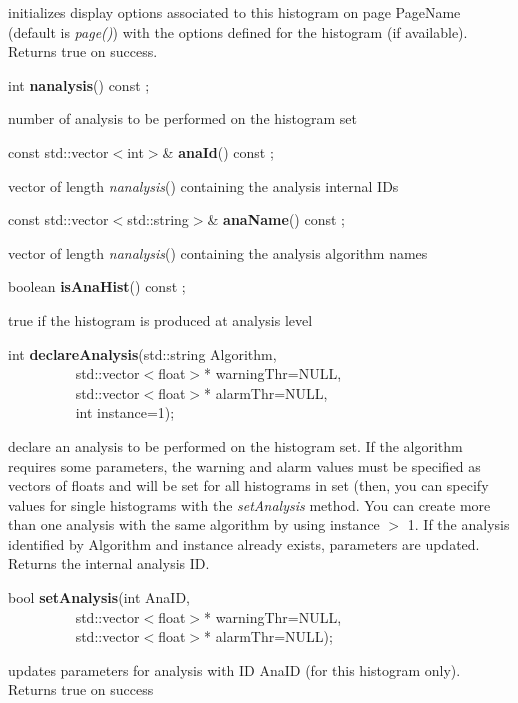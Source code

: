  initializes display options associated to this histogram on page
 PageName (default is {\it page()}) with the
 options defined for the histogram (if available). Returns true on
 success.


\item    int {\bf nanalysis}() const ;

 number of analysis to be performed on the histogram set


\item    const std::vector$<$int$>$\& {\bf anaId}() const ;

 vector of length {\it  nanalysis}() containing the analysis internal IDs


\item    const std::vector$<$std::string$>$\& {\bf anaName}() const ;

 vector of length {\it  nanalysis}() containing the analysis algorithm names


\item    boolean {\bf isAnaHist}() const ;

 true if the histogram is produced at analysis level


\item    int {\bf declareAnalysis}(std::string Algorithm,\\\mbox{}~~~~~~~~~ 
		      std::vector$<$float$>$* warningThr=NULL,\\\mbox{}~~~~~~~~~ 
		      std::vector$<$float$>$* alarmThr=NULL,\\\mbox{}~~~~~~~~~ 
		      int instance=1);

 declare an analysis to be performed on the histogram set. If the algorithm
 requires some parameters, the warning and alarm values must be
 specified as vectors of floats and will be set for all histograms in
 set (then, you can specify values for single histograms with the {\it
 setAnalysis} method. 
 You can create more than one analysis
 with the same algorithm by using instance $>$ 1. If the analysis
 identified by Algorithm and instance already exists, parameters are
 updated. Returns the internal analysis ID.


\item    bool {\bf setAnalysis}(int AnaID,\\\mbox{}~~~~~~~~~ 
		   std::vector$<$float$>$* warningThr=NULL,\\\mbox{}~~~~~~~~~ 
		   std::vector$<$float$>$* alarmThr=NULL);

 updates parameters for analysis with ID AnaID (for this histogram only). Returns true on success


